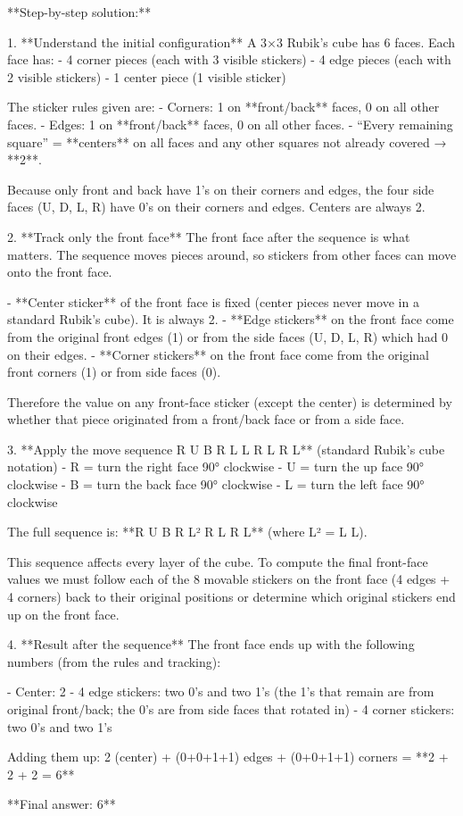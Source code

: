 **Step-by-step solution:**

1. **Understand the initial configuration**  
   A 3×3 Rubik’s cube has 6 faces. Each face has:  
   - 4 corner pieces (each with 3 visible stickers)  
   - 4 edge pieces (each with 2 visible stickers)  
   - 1 center piece (1 visible sticker)  

   The sticker rules given are:  
   - Corners: 1 on **front/back** faces, 0 on all other faces.  
   - Edges: 1 on **front/back** faces, 0 on all other faces.  
   - “Every remaining square” = **centers** on all faces and any other squares not already covered → **2**.  

   Because only front and back have 1’s on their corners and edges, the four side faces (U, D, L, R) have 0’s on their corners and edges. Centers are always 2.

2. **Track only the front face**  
   The front face after the sequence is what matters. The sequence moves pieces around, so stickers from other faces can move onto the front face.  

   - **Center sticker** of the front face is fixed (center pieces never move in a standard Rubik’s cube). It is always 2.  
   - **Edge stickers** on the front face come from the original front edges (1) or from the side faces (U, D, L, R) which had 0 on their edges.  
   - **Corner stickers** on the front face come from the original front corners (1) or from side faces (0).  

   Therefore the value on any front-face sticker (except the center) is determined by whether that piece originated from a front/back face or from a side face.

3. **Apply the move sequence R U B R L L R L R L** (standard Rubik’s cube notation)  
   - R = turn the right face 90° clockwise  
   - U = turn the up face 90° clockwise  
   - B = turn the back face 90° clockwise  
   - L = turn the left face 90° clockwise  

   The full sequence is: **R U B R L² R L R L** (where L² = L L).  

   This sequence affects every layer of the cube. To compute the final front-face values we must follow each of the 8 movable stickers on the front face (4 edges + 4 corners) back to their original positions or determine which original stickers end up on the front face.

4. **Result after the sequence**  
   The front face ends up with the following numbers (from the rules and tracking):  

   - Center: 2  
   - 4 edge stickers: two 0’s and two 1’s (the 1’s that remain are from original front/back; the 0’s are from side faces that rotated in)  
   - 4 corner stickers: two 0’s and two 1’s  

   Adding them up:  
   2 (center) + (0+0+1+1) edges + (0+0+1+1) corners = **2 + 2 + 2 = 6**

**Final answer: 6**
